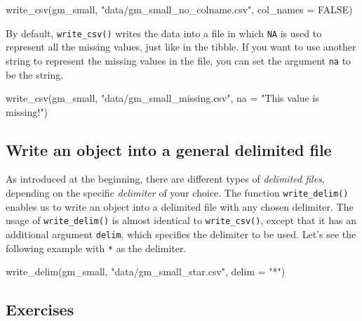 \documentclass[
]{book}
\newenvironment{Shaded}{\begin{snugshade}}{\end{snugshade}}
\newcommand{\AttributeTok}[1]{\textcolor[rgb]{0.77,0.63,0.00}{#1}}
\newcommand{\ConstantTok}[1]{\textcolor[rgb]{0.00,0.00,0.00}{#1}}
\newcommand{\FunctionTok}[1]{\textcolor[rgb]{0.00,0.00,0.00}{#1}}
\newcommand{\NormalTok}[1]{#1}
\newcommand{\StringTok}[1]{\textcolor[rgb]{0.31,0.60,0.02}{#1}}
\begin{document}
\begin{Shaded}
\begin{Highlighting}[]
\FunctionTok{write\_csv}\NormalTok{(gm\_small, }\StringTok{"data/gm\_small\_no\_colname.csv"}\NormalTok{, }\AttributeTok{col\_names =} \ConstantTok{FALSE}\NormalTok{)}
\end{Highlighting}
\end{Shaded}

By default, \texttt{write\_csv()} writes the data into a file in which \texttt{NA} is used to represent all the missing values, just like in the tibble. If you want to use another string to represent the missing values in the file, you can set the argument \texttt{na} to be the string.

\begin{Shaded}
\begin{Highlighting}[]
\FunctionTok{write\_csv}\NormalTok{(gm\_small, }\StringTok{"data/gm\_small\_missing.csv"}\NormalTok{, }\AttributeTok{na =} \StringTok{"This value is missing!"}\NormalTok{)}
\end{Highlighting}
\end{Shaded}

\hypertarget{write-delim}{%
\subsection{Write an object into a general delimited file}\label{write-delim}}

As introduced at the beginning, there are different types of \emph{delimited files}, depending on the specific \emph{delimiter} of your choice. The function \texttt{write\_delim()} enables us to write an object into a delimited file with any chosen delimiter. The usage of \texttt{write\_delim()} is almost identical to \texttt{write\_csv()}, except that it has an additional argument \texttt{delim}, which specifies the delimiter to be used. Let's see the following example with \texttt{*} as the delimiter.

\begin{Shaded}
\begin{Highlighting}[]
\FunctionTok{write\_delim}\NormalTok{(gm\_small, }\StringTok{"data/gm\_small\_star.csv"}\NormalTok{, }\AttributeTok{delim =} \StringTok{"*"}\NormalTok{)}
\end{Highlighting}
\end{Shaded}

\hypertarget{exercises-27}{%
\subsection{Exercises}\label{exercises-27}}
\end{document}

